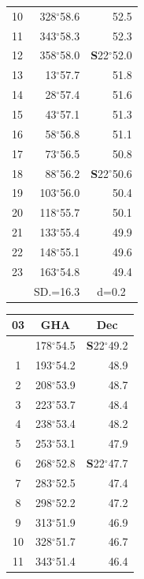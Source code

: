 \documentclass[10pt, a4paper]{report}
\begin{document}
\begin{scriptsize}
\begin{tabular*}{0.2\textwidth}[t]{@{\extracolsep{\fill}}|c|rr|}
10 & 328$^\circ$58.6 & 52.5\\
11 & 343$^\circ$58.3 & 52.3\\[2Pt]
12 & 358$^\circ$58.0 & \textbf{S}22$^\circ$52.0\\
13 & 13$^\circ$57.7 & 51.8\\
14 & 28$^\circ$57.4 & 51.6\\
15 & 43$^\circ$57.1 & \raisebox{0.24ex}{\boldmath$\cdot$~\boldmath$\cdot$~~}51.3\\
16 & 58$^\circ$56.8 & 51.1\\
17 & 73$^\circ$56.5 & 50.8\\[2Pt]
18 & 88$^\circ$56.2 & \textbf{S}22$^\circ$50.6\\
19 & 103$^\circ$56.0 & 50.4\\
20 & 118$^\circ$55.7 & 50.1\\
21 & 133$^\circ$55.4 & \raisebox{0.24ex}{\boldmath$\cdot$~\boldmath$\cdot$~~}49.9\\
22 & 148$^\circ$55.1 & 49.6\\
23 & 163$^\circ$54.8 & 49.4\\
\hline
\rule{0pt}{2.4ex} & \multicolumn{1}{c}{SD.=16.3} & \multicolumn{1}{c|}{d=0.2}\\
\hline
\end{tabular*}\noindent
\begin{tabular*}{0.2\textwidth}[t]{@{\extracolsep{\fill}}|c|rr|}
\hline
\multicolumn{1}{|c|}{\rule{0pt}{2.6ex}\textbf{03}} & \multicolumn{1}{c}{\textbf{GHA}} & \multicolumn{1}{c|}{\textbf{Dec}}\\
\hline\rule{0pt}{2.6ex}\noindent
0 & 178$^\circ$54.5 & \textbf{S}22$^\circ$49.2\\
1 & 193$^\circ$54.2 & 48.9\\
2 & 208$^\circ$53.9 & 48.7\\
3 & 223$^\circ$53.7 & \raisebox{0.24ex}{\boldmath$\cdot$~\boldmath$\cdot$~~}48.4\\
4 & 238$^\circ$53.4 & 48.2\\
5 & 253$^\circ$53.1 & 47.9\\[2Pt]
6 & 268$^\circ$52.8 & \textbf{S}22$^\circ$47.7\\
7 & 283$^\circ$52.5 & 47.4\\
8 & 298$^\circ$52.2 & 47.2\\
9 & 313$^\circ$51.9 & \raisebox{0.24ex}{\boldmath$\cdot$~\boldmath$\cdot$~~}46.9\\
10 & 328$^\circ$51.7 & 46.7\\
11 & 343$^\circ$51.4 & 46.4\\[2Pt]

\end{tabular*}
\end{scriptsize}
\end{document}
